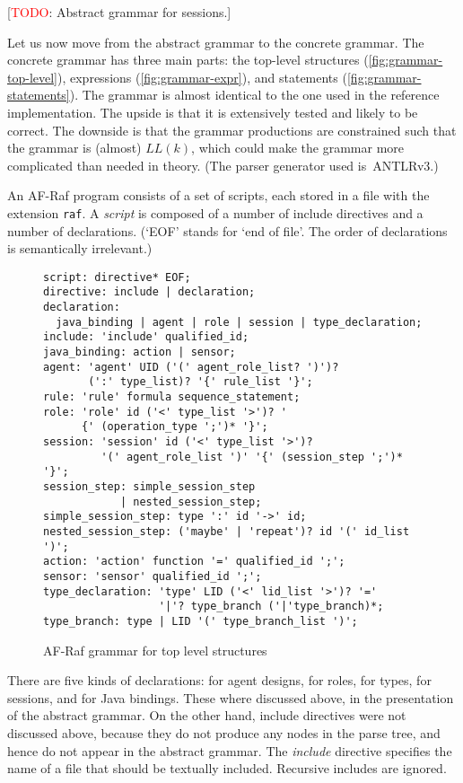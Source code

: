 \documentclass[a4paper,12pt,oneside,fleqn]{book} %
\newcommand{\todo}[1]{[\textcolor{red}{TODO}: #1]}
\begin{document}
\todo{Abstract grammar for sessions.}

Let us now move from the abstract grammar to the concrete grammar.  The
concrete grammar has three main parts: the top-level structures
(\autoref{fig:grammar-top-level}), expressions
(\autoref{fig:grammar-expr}), and statements
(\autoref{fig:grammar-statements}). The grammar is almost identical to the
one used in the reference implementation. The upside is that it is
extensively tested and likely to be correct. The downside is that the
grammar productions are constrained such that the grammar is (almost)
$LL(k)$, which could make the grammar more complicated than needed in
theory. (The parser generator used is~ANTLRv3.)

An AF-Raf program consists of a set of scripts, each stored in a file with
the extension {\tt raf}.  A {\it script\/} is composed of a number of
include directives and a number of declarations. (`EOF' stands for `end of
file'. The order of declarations is semantically irrelevant.)

\begin{figure}\footnotesize %
\begin{verbatim}
script: directive* EOF;
directive: include | declaration;
declaration:
  java_binding | agent | role | session | type_declaration;
include: 'include' qualified_id;
java_binding: action | sensor;
agent: 'agent' UID ('(' agent_role_list? ')')?
       (':' type_list)? '{' rule_list '}';
rule: 'rule' formula sequence_statement;
role: 'role' id ('<' type_list '>')? '
      {' (operation_type ';')* '}';
session: 'session' id ('<' type_list '>')?
         '(' agent_role_list ')' '{' (session_step ';')* '}';
session_step: simple_session_step
            | nested_session_step;
simple_session_step: type ':' id '->' id;
nested_session_step: ('maybe' | 'repeat')? id '(' id_list ')';
action: 'action' function '=' qualified_id ';';
sensor: 'sensor' qualified_id ';';
type_declaration: 'type' LID ('<' lid_list '>')? '='
                  '|'? type_branch ('|'type_branch)*;
type_branch: type | LID '(' type_branch_list ')';
\end{verbatim}
\caption{AF-Raf grammar for top level structures}
\label{fig:grammar-top-level}
\end{figure} %

There are five kinds of declarations: for agent designs, for roles, for
types, for sessions, and for Java bindings. These where discussed above, in
the presentation of the abstract grammar. On the other hand, include
directives were not discussed above, because they do not produce any nodes
in the parse tree, and hence do not appear in the abstract grammar.  The
{\it include} directive specifies the name of a file that should be
textually included. Recursive includes are ignored.
\end{document}
